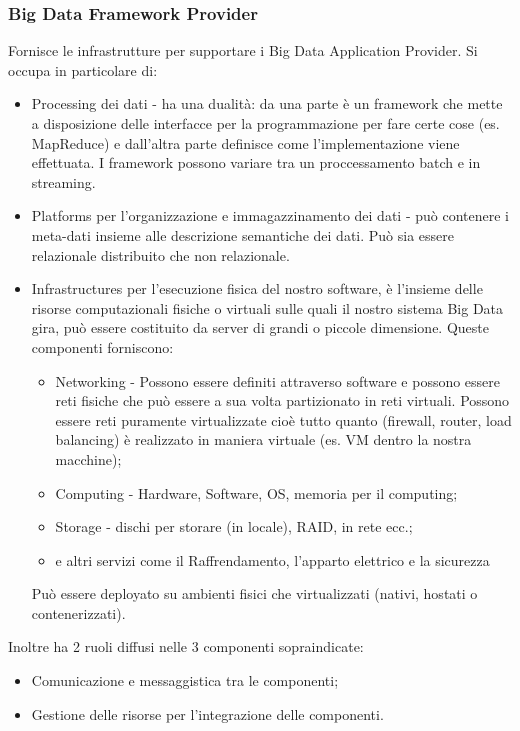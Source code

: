 \documentclass[11pt, twocolumn]{article}
\newenvironment{myitemize}
{ \begin{itemize}[topsep=0ex]
		\setlength{\itemsep}{0pt}
		\setlength{\parskip}{0pt}
		\setlength{\parsep}{0pt}     }
	{ \end{itemize}                  }
\begin{document}
\subsubsection{Big Data Framework Provider}
Fornisce le infrastrutture per supportare i Big Data Application Provider. Si occupa in particolare di:
\begin{myitemize}
	\item Processing dei dati - ha una dualità: da una parte è un framework che mette a disposizione delle interfacce per la programmazione per fare certe cose (es. MapReduce) e dall'altra parte definisce come l'implementazione viene effettuata. I framework possono variare tra un proccessamento batch e in streaming.
	\item Platforms per l'organizzazione e immagazzinamento dei dati - può contenere i meta-dati insieme alle descrizione semantiche dei dati. 
	Può sia essere relazionale distribuito che non relazionale.
	\item Infrastructures per l'esecuzione fisica del nostro software, è l'insieme delle risorse computazionali fisiche o virtuali sulle quali il nostro sistema Big Data gira, può essere costituito da server di grandi o piccole dimensione. 
	Queste componenti forniscono:
	\begin{myitemize}
		\item Networking - Possono essere definiti attraverso software e possono essere reti fisiche che può essere a sua volta partizionato in reti virtuali. 
		Possono essere reti puramente virtualizzate cioè tutto quanto (firewall, router, load balancing) è realizzato in maniera virtuale (es. VM dentro la nostra macchine);
		\item Computing - Hardware, Software, OS, memoria per il computing;
		\item Storage - dischi per storare (in locale), RAID, in rete ecc.;
		\item e altri servizi come il Raffrendamento, l'apparto elettrico e la sicurezza
	\end{myitemize}
	Può essere deployato su ambienti fisici che virtualizzati (nativi, hostati o contenerizzati).
\end{myitemize}
Inoltre ha 2 ruoli diffusi nelle 3 componenti sopraindicate:
\begin{myitemize}
	\item Comunicazione e messaggistica tra le componenti;
	\item Gestione delle risorse per l'integrazione delle componenti.
\end{myitemize}
\end{document}
